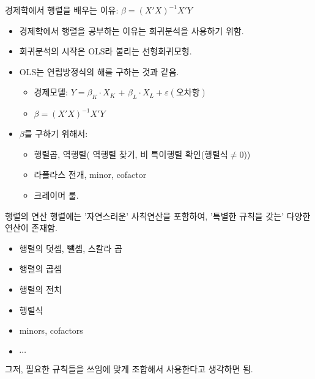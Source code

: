 \documentclass[aspectratio=169]{beamer}
\begin{document}
\begin{frame}{경제학에서 행렬을 배우는 이유: $\beta=(X'X)^{-1}X'Y$}
  \begin{itemize}
    \item 경제학에서 행렬을 공부하는 이유는 회귀분석을 사용하기 위함.
    \item 회귀분석의 시작은 OLS라 불리는 선형회귀모형.
    \item OLS는 연립방정식의 해를 구하는 것과 같음.
    \begin{itemize}
      \item 경제모델: $Y = \beta_{K}\cdot X_K$ + $\beta_{L}\cdot X_L + \varepsilon(\text{오차항})$
      \item $\beta=(X'X)^{-1}X'Y$
    \end{itemize}
    \item $\beta$를 구하기 위해서:
    \begin{itemize}
      \item 행렬곱, 역행렬( 역행렬 찾기, 비 특이행렬 확인(행렬식$\neq 0$))
      \item 라플라스 전개, minor, cofactor
      \item 크레이머 룰.
    \end{itemize}
  \end{itemize}
\end{frame}



\begin{frame}{행렬의 연산 }
  행렬에는 '자연스러운' 사칙연산을 포함하여, '특별한 규칙을 갖는' 다양한 연산이 존재함. \\
  \begin{itemize}
    \item 행렬의 덧셈, 뺄셈, 스칼라 곱 
    \item 행렬의 곱셈 
    \item 행렬의 전치
    \item 행렬식
    \item minors, cofactors
    \item $\cdots$
  \end{itemize}
  그저, 필요한 규칙들을 쓰임에 맞게 조합해서 사용한다고 생각하면 됨.
\end{frame}
\end{document}
